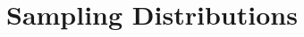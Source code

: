 \documentclass[../stats.tex]{subfiles}
\begin{document}
\chapter{Sampling Distributions}
\end{document}
